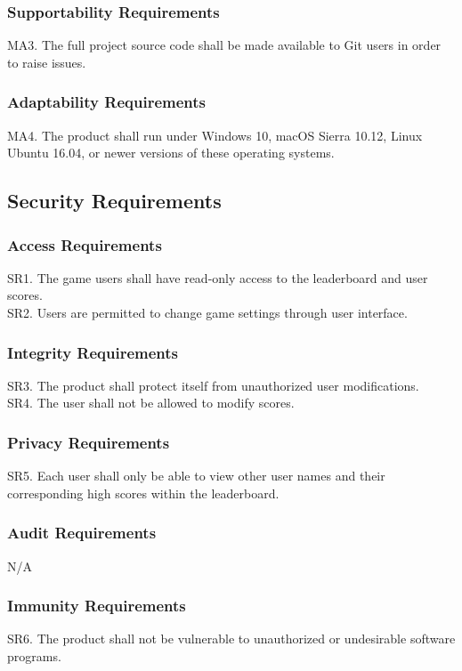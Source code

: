 \documentclass[12pt]{article}
\begin{document}
	\subsubsection{Supportability Requirements}
	MA3. The full project source code shall be made available to Git users in order to raise issues.
	
	\subsubsection{Adaptability Requirements}
	MA4. The product shall run under Windows 10, macOS Sierra 10.12, Linux Ubuntu 16.04, or newer versions of these operating systems.
	
	\subsection{Security Requirements}
	\subsubsection{Access Requirements}
	SR1. The game users shall have read-only access to the leaderboard and user scores. \\
	SR2. Users are permitted to change game settings through user interface.
	
	\subsubsection{Integrity Requirements}
	SR3. The product shall protect itself from unauthorized user modifications.\\
	SR4. The user shall not be allowed to modify scores.
	
	\subsubsection{Privacy Requirements}
	SR5. Each user shall only be able to view other user names and their corresponding high scores within the leaderboard.
	
	\subsubsection{Audit Requirements}
	N/A
	
	\subsubsection{Immunity Requirements}
	SR6. The product shall not be vulnerable to unauthorized or undesirable software programs.
	
\end{document}
